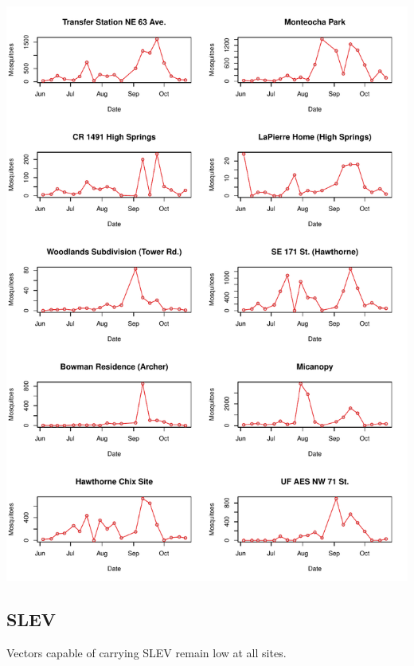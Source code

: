 \documentclass{article}
\begin{document}
\begin{center}
\includegraphics{mosq28oct13-008}
\newpage
\subsection*{SLEV}

\end{center}

Vectors capable of carrying SLEV remain low at all sites.\\
\end{document}
